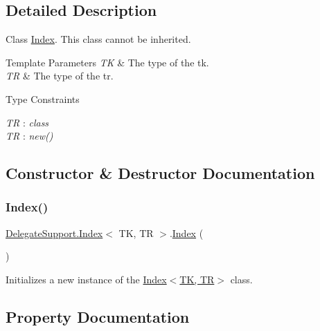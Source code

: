 \subsection{Detailed Description}
Class \hyperlink{class_delegate_support_1_1_index}{Index}. This class cannot be inherited. 


\begin{DoxyTemplParams}{Template Parameters}
{\em TK} & The type of the tk.\\
\hline
{\em TR} & The type of the tr.\\
\hline
\end{DoxyTemplParams}
\begin{Desc}
\item[Type Constraints]\begin{description}
\item[{\em TR} : {\em class}]\item[{\em TR} : {\em new()}]\end{description}
\end{Desc}


\subsection{Constructor \& Destructor Documentation}
\mbox{\label{class_delegate_support_1_1_index_a7d8202fe76720a1deb3751b45d1409ff}} 
\subsubsection{\texorpdfstring{Index()}{Index()}}
{\footnotesize\ttfamily \hyperlink{class_delegate_support_1_1_index}{Delegate\+Support.\+Index}$<$ TK, TR $>$.\hyperlink{class_delegate_support_1_1_index}{Index} (\begin{DoxyParamCaption}{ }\end{DoxyParamCaption})\hspace{0.3cm}{\ttfamily [inline]}}



Initializes a new instance of the \hyperlink{class_delegate_support_1_1_index_a7d8202fe76720a1deb3751b45d1409ff}{Index$<$\+T\+K, T\+R$>$} class. 



\subsection{Property Documentation}
\mbox{\label{class_delegate_support_1_1_index_a0d0e0be0a9e6aa092055fe2282c6e64b}} 
